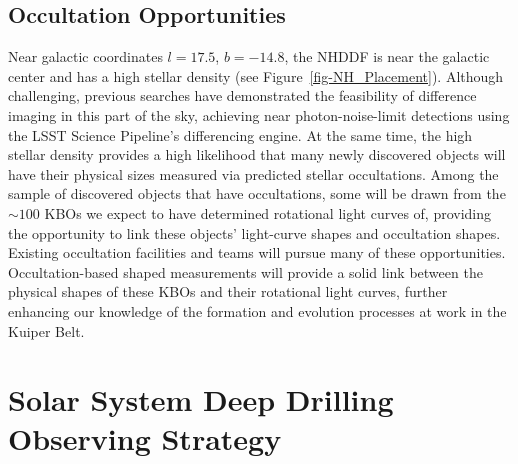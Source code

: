 \documentclass[modern,linenumbers,trackchanges,preprint]{aastex631}
\begin{document}
\subsection{Occultation Opportunities}
Near galactic coordinates $l=17.5$, $b=-14.8$, the NHDDF is near the galactic center and has a high stellar density (see Figure~\ref{fig-NH_Placement}).  Although challenging, previous searches \citep[e.g.][]{Fraser2024PSJ} have demonstrated the feasibility of difference imaging in this part of the sky, achieving near photon-noise-limit detections using the LSST Science Pipeline's differencing engine.
At the same time, the high stellar density provides a high likelihood that many newly discovered objects will have their physical sizes measured via predicted stellar occultations. Among the sample of discovered objects that have occultations, some will be drawn from the $\sim 100$ KBOs we expect to have determined rotational light curves of, providing the opportunity to link these objects' light-curve shapes and occultation shapes. Existing occultation facilities \cite[e.g.][]{RECON16} and teams will pursue many of these opportunities. Occultation-based shaped measurements will provide a solid link between the physical shapes of these KBOs and their rotational light curves, further enhancing our knowledge of the formation and evolution processes at work in the Kuiper Belt.

\section{Solar System Deep Drilling Observing Strategy\label{sec:strategy}}
\end{document}
